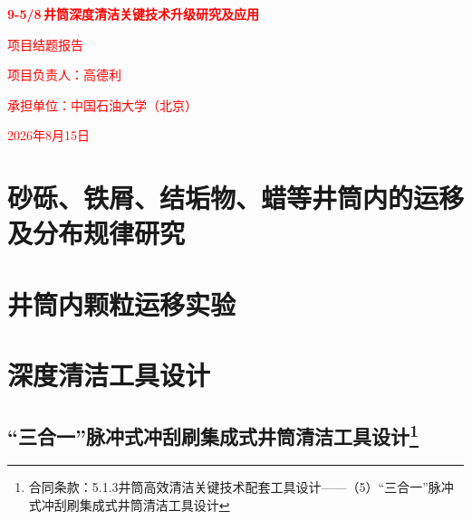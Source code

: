 \documentclass[12pt, a4paper, zihao=-4, openright]{ctexrep}
\newcommand{\inch}{\,\text{''}} %
\begin{document}
\begin{titlepage}
    \centering 
    \vspace*{4cm} 
    {\Huge \bfseries \textcolor{red}{9-5/8\inch 井筒深度清洁关键技术升级研究及应用} \par} 
    \vspace{2cm} 
    {\Large \textcolor{red}{项目结题报告} \par} 
    \vspace{4cm} 
    {\Large \textcolor{red}{项目负责人：高德利} \par}
    \vspace{1cm}
    {\Large \textcolor{red}{承担单位：中国石油大学（北京）} \par}
    \vspace{1cm}
    {\Large \textcolor{red}{2026年8月15日} \par}
\end{titlepage}

\clearpage
{} 
\tableofcontents

\clearpage
{} 
\setcounter{page}{1}   


\chapter{砂砾、铁屑、结垢物、蜡等井筒内的运移及分布规律研究}
\chapter{井筒内颗粒运移实验}
\chapter{深度清洁工具设计}
\section[“三合一”脉冲式冲刮刷集成式井筒清洁工具设计]{“三合一”脉冲式冲刮刷集成式井筒清洁工具设计\protect\footnote{合同条款：5.1.3井筒高效清洁关键技术配套工具设计——（5）“三合一”脉冲式冲刮刷集成式井筒清洁工具设计}}\label{sec:design_of_3_in_1}
\end{document}
